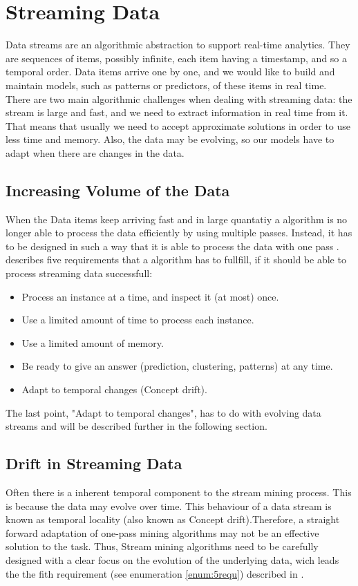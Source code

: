 \documentclass[12pt,oneside,a4paper,parskip]{scrbook}
\begin{document}
\pagebreak

\section{Streaming Data}

Data streams are an algorithmic abstraction to support real-time analytics. They are sequences of items, 
possibly infinite, each item having a timestamp, and so a temporal order. Data items arrive one by one, 
and we would like to build and maintain models, such as patterns or predictors, of these items in real time. 
There are two main algorithmic challenges when dealing with streaming data: the stream is large and fast, 
and we need to extract information in real time from it. That means that usually we need to accept approximate 
solutions in order to use less time and memory.
Also, the data may be evolving, so our models have to adapt when there are changes in the data. \cite{MLonDataStreams}

\subsection{Increasing Volume of the Data}
When the Data items keep arriving fast and in large quantatiy a algorithm is no longer able to process the data efficiently
by using multiple passes. Instead, it has to be designed in such a way that it is able to process the data with one pass \cite{aggarwal2007data}.
\cite{MLonDataStreams} describes five requirements that a algorithm has to fullfill, if it should be able to process streaming data successfull:

\begin{itemize}
  \item Process an instance at a time, and inspect it (at most) once.
  \item Use a limited amount of time to process each instance.
  \item Use a limited amount of memory.
  \item Be ready to give an answer (prediction, clustering, patterns) at any time.
  \item Adapt to temporal changes (Concept drift).
  \label{enum:5requ}
\end{itemize}

The last point, "Adapt to temporal changes", has to do with evolving data streams and will be described further in the following 
section.

\subsection{Drift in Streaming Data}
Often there is a inherent temporal component to the stream mining process. This is because the data may evolve over time. 
This behaviour of a data stream is known as temporal locality\cite{aggarwal2007data} (also known as Concept drift)\cite{MLonDataStreams}.Therefore, 
a straight forward adaptation of one-pass mining algorithms may not be an effective solution to the task.
Thus, Stream mining algorithms need to be carefully designed with a clear focus on the evolution of the underlying data, 
wich leads the the fith requirement (see enumeration \ref{enum:5requ}) described in \cite{MLonDataStreams}.
\end{document}
